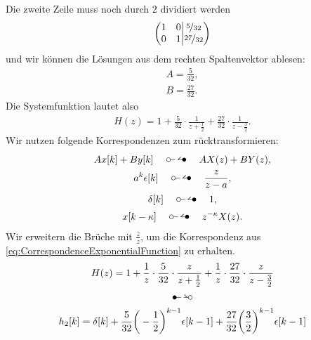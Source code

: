 \documentclass[11pt,a4paper,DIV=12]{scrartcl}
\begin{document}
%
%
%
Die zweite Zeile muss noch durch $2$ dividiert werden
%
%
%
\begin{gather}
	\left\lparen
	\begin{matrix}
		1 & 0 \\
		0&1
	\end{matrix}
	\middle\vert
	\begin{matrix}
		\nicefrac{5}{32} \\
		\nicefrac{27}{32}
	\end{matrix}
	\right\rparen
\end{gather}
%
%
und wir können die Lösungen aus dem rechten Spaltenvektor ablesen:
%
%
\begin{gather}
	A=\frac{5}{32},\\
	B=\frac{27}{32}.
\end{gather}
%
Die Systemfunktion lautet also
%
\begin{gather}
	H(z)=1+\frac{5}{32}\cdot\frac{1}{z+\frac{1}{2}}+\frac{27}{32}\cdot\frac{1}{z-\frac{3}{2}}.
\end{gather}
%
Wir nutzen folgende Korrespondenzen zum rücktransformieren:
%
\begin{gather}
	Ax[k]+By[k]\quad \ztransf\quad AX(z)+BY(z),\\
	\label{eq:CorrespondenceExponentialFunction}
	a^k\epsilon[k]\quad\ztransf\quad \frac{z}{z-a},\\
	\delta[k]\quad\ztransf\quad 1,\\
	x[k-\kappa]\quad\ztransf\quad z^{-\kappa}X(z).
\end{gather}
%
Wir erweitern die Brüche mit $\frac{z}{z}$, um die Korrespondenz aus \eqref{eq:CorrespondenceExponentialFunction} zu erhalten.
%
%
\begin{gather}
	H(z)=1+ \frac{1}{z}\cdot\frac{5}{32}\cdot\frac{z}{z+\frac{1}{2}}+\frac{1}{z}\cdot\frac{27}{32}\cdot\frac{z}{z-\frac{3}{2}}\nonumber\\
	\Ztransf\nonumber\\
	h_2[k]=\delta[k]+\frac{5}{32}\bigg (-\frac{1}{2}\bigg )^{k-1}\epsilon[k-1]+\frac{27}{32}\bigg (\frac{3}{2}\bigg )^{k-1}\epsilon[k-1]\nonumber
\end{gather}
%
%
\newpage
\end{document}
